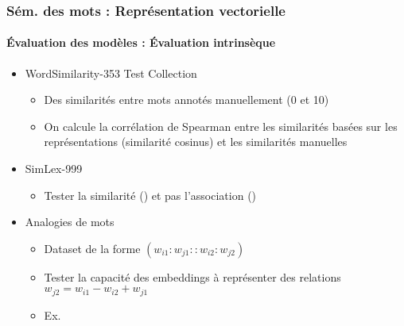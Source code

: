 \documentclass[xcolor=table]{beamer}
\begin{document}
\begin{frame}
\frametitle{Sém. des mots : Représentation vectorielle}
\framesubtitle{Évaluation des modèles : Évaluation intrinsèque}

\begin{itemize}
	\item  WordSimilarity-353 Test Collection \cite{2002-finkelstein-al}
	\begin{itemize}
		\item Des similarités entre mots annotés manuellement (0 et 10)
		\item On calcule la corrélation de Spearman entre les similarités basées sur les représentations (similarité cosinus) et les similarités manuelles
	\end{itemize}
	
	\item SimLex-999 \cite{2015-hill-al}
	\begin{itemize}
		\item Tester la similarité () et pas l'association ()
	\end{itemize}

	\item Analogies de mots \cite{2013-mikolov-al2}
	\begin{itemize}
		\item Dataset de la forme $(w_{i1}:w_{j1} :: w_{i2}:w_{j2})$
		\item Tester la capacité des embeddings à représenter des relations $w_{j2} = w_{i1} - w_{i2} + w_{j1}$
		\item Ex. 
	\end{itemize}

\end{itemize}
	
\end{frame}
\end{document}
